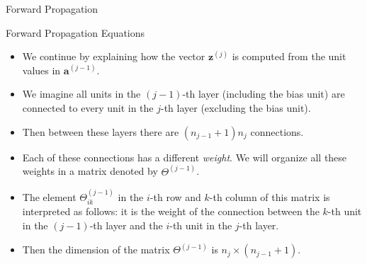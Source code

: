 \documentclass[8pt,american]{beamer}
\begin{document}
\begin{frame}{Forward Propagation}

\begin{block}{Forward Propagation Equations}
\begin{itemize}
\justifying
\item We continue by explaining how the vector $\mathbf{z}^{\left(j\right)}$ is
  computed from the unit values in $\mathbf{a}^{\left(j-1\right)}$.
\item We imagine all units in the $\left(j-1\right)$-th layer (including the
  bias unit) are connected to every unit in the $j$-th layer (excluding the
  bias unit).
\item Then between these layers there are $\left(n_{j-1}+1\right)n_{j}$
  connections.
\item Each of these connections has a different \textit{weight}. We will
  organize all these weights in a matrix denoted by $\Theta^{\left(j-1\right)}$.
\item The element $\Theta_{ik}^{\left(j-1\right)}$ in the $i$-th row and $k$-th
  column of this matrix is interpreted as follows: it is the weight of the
  connection between the $k$-th unit in the $\left(j-1\right)$-th layer and the
  $i$-th unit in the $j$-th layer.
\item Then the dimension of the matrix $\Theta^{\left(j-1\right)}$ is
  $n_{j}\times\left(n_{j-1}+1\right)$.
\end{itemize}
\end{block}

\end{frame}
\end{document}

